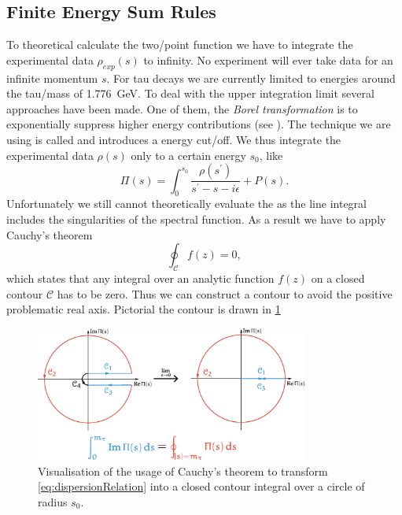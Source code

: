 \documentclass[../../index.tex]{subfiles}
\begin{document}
\subsection{Finite Energy Sum Rules}
To theoretical calculate the two\-/point function we have to integrate the
experimental data \(\rho_{exp}(s)\) to infinity. No experiment will ever take
data for an infinite momentum \(s\). For tau decays we are currently limited to
energies around the tau\-/mass of \SI{1.776}{\giga\eV}. To deal with the upper
integration limit several approaches have been made. One of them, the
\textit{Borel transformation} is to exponentially suppress higher energy
contributions (see \cite{Weinberg1996,Rafael1997}). The technique we are using
is called  and introduces a energy
cut\-/off. We thus integrate the experimental data \(\rho(s)\) only to a certain
energy \(s_0\), like
\begin{equation}
  \Pi(s) = \int_0^{s_0} \frac{\rho(s^\prime)}{s^\prime-s-i\epsilon} + P(s).
\end{equation}
Unfortunately we still cannot theoretically evaluate the
 as the line integral includes the singularities
of the spectral function. As a result we have to apply Cauchy's theorem
\begin{equation}
  \oint_{\mathcal{C}} f(z) = 0,
\end{equation}
which states that any integral over an analytic function \(f(z)\) on a closed
contour \(\mathcal{C}\) has to be zero. Thus we can construct a contour to avoid
the positive problematic real axis. Pictorial the contour is drawn in
\cref{fig:theoreticalTwoPointFunction}
\begin{figure}
  \centering
  \includegraphics[width=0.8\textwidth]{./images/rTauCauchysTheorem.eps}
  \caption{Visualisation of the usage of Cauchy's theorem to transform
    \cref{eq:dispersionRelation} into a closed contour integral over a circle of
    radius $s_0$.}
  \label{fig:theoreticalTwoPointFunction}
\end{figure}
\end{document}
